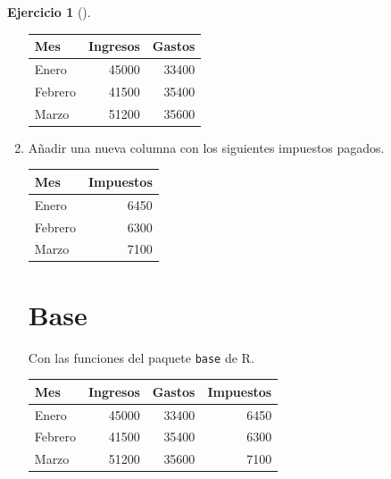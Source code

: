 \documentclass[
  spanish,
  a4paper,
]{scrreport}
\newenvironment{Shaded}{\begin{snugshade}}{\end{snugshade}}
\newcommand{\DecValTok}[1]{\textcolor[rgb]{0.68,0.00,0.00}{#1}}
\newcommand{\FunctionTok}[1]{\textcolor[rgb]{0.28,0.35,0.67}{#1}}
\newcommand{\NormalTok}[1]{\textcolor[rgb]{0.00,0.23,0.31}{#1}}
\newcommand{\OtherTok}[1]{\textcolor[rgb]{0.00,0.23,0.31}{#1}}
\newcommand{\SpecialCharTok}[1]{\textcolor[rgb]{0.37,0.37,0.37}{#1}}
\theoremstyle{definition}
\newtheorem{exercise}{Ejercicio}[chapter]
\theoremstyle{remark}
\begin{document}
\begin{exercise}[]
\begin{enumerate}
\begin{tcolorbox}
  \begin{longtable}[]{@{}lrr@{}}
  \toprule\noalign{}
  Mes & Ingresos & Gastos \\
  \midrule\noalign{}
  \endhead
  \bottomrule\noalign{}
  \endlastfoot
  Enero & 45000 & 33400 \\
  Febrero & 41500 & 35400 \\
  Marzo & 51200 & 35600 \\
  \end{longtable}

  \end{tcolorbox}
\item
  Añadir una nueva columna con los siguientes impuestos pagados.

  \begin{longtable}[]{@{}lr@{}}
  \toprule\noalign{}
  Mes & Impuestos \\
  \midrule\noalign{}
  \endhead
  \bottomrule\noalign{}
  \endlastfoot
  Enero & 6450 \\
  Febrero & 6300 \\
  Marzo & 7100 \\
  \end{longtable}

  \begin{tcolorbox}[enhanced jigsaw, titlerule=0mm, arc=.35mm, rightrule=.15mm, opacitybacktitle=0.6, leftrule=.75mm, colframe=quarto-callout-tip-color-frame, toptitle=1mm, breakable, colbacktitle=quarto-callout-tip-color!10!white, bottomrule=.15mm, colback=white, left=2mm, bottomtitle=1mm, opacityback=0, title=\textcolor{quarto-callout-tip-color}{\faLightbulb}\hspace{0.5em}{Solución}, toprule=.15mm, coltitle=black]

  \section{Base}

  Con las funciones del paquete \texttt{base} de R.

\begin{Shaded}
\end{Shaded}

  \begin{longtable}[]{@{}lrrr@{}}
  \toprule\noalign{}
  Mes & Ingresos & Gastos & Impuestos \\
  \midrule\noalign{}
  \endhead
  \bottomrule\noalign{}
  \endlastfoot
  Enero & 45000 & 33400 & 6450 \\
  Febrero & 41500 & 35400 & 6300 \\
  Marzo & 51200 & 35600 & 7100 \\
  \end{longtable}


\end{tcolorbox}
\end{enumerate}
\end{exercise}
\end{document}
